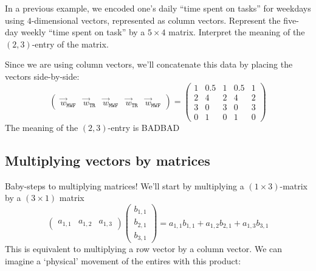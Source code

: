 \documentclass{ximera}
\begin{document}
\begin{example}
  In a previous example, we encoded one's daily ``time spent on
  tasks'' for weekdays using $4$-dimensional vectors, represented as
  column vectors. Represent the five-day weekly ``time spent on task''
  by a $5\times 4$ matrix. Interpret the meaning of the $(2,3)$-entry
  of the matrix.
  \begin{solution}
    Since we are using column vectors, we'll concatenate this data by
    placing the vectors side-by-side:
    \[
    \begin{pmatrix}
      \vec{w}_{\texttt{MWF}} & \vec{w}_{\texttt{TR}} & \vec{w}_{\texttt{MWF}} & \vec{w}_{\texttt{TR}} & \vec{w}_{\texttt{MWF}}
    \end{pmatrix}
    =
    \begin{pmatrix}
      1 & 0.5 & 1 & 0.5 & 1 \\
      2 & 4   & 2 & 4   & 2 \\
      3 & 0   & 3 & 0   & 3 \\
      0 & 1   & 0 & 1   & 0
    \end{pmatrix}
    \]
    The meaning of the $(2,3)$-entry is BADBAD
  \end{solution}
\end{example}







\subsection{Multiplying vectors by matrices}

Baby-steps to multiplying matrices! We'll start by multiplying a $(1\times 3)$-matrix by a $(3\times 1)$ matrix
\[
\begin{pmatrix} a_{1,1} & a_{1,2} & a_{1,3} \end{pmatrix}
\begin{pmatrix} b_{1,1} \\ b_{2,1} \\ b_{3,1} \end{pmatrix} = a_{1,1}b_{1,1} + a_{1,2}b_{2,1} + a_{1,3}b_{3,1}
\]
This is equivalent to multiplying a row vector by a column vector. We
can imagine a `physical' movement of the entires with this product:
\end{document}
